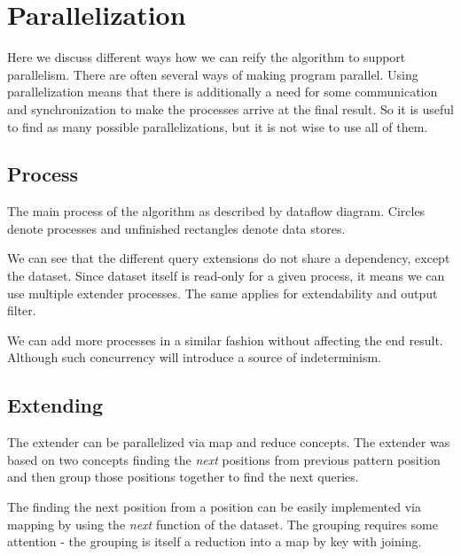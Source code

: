 \chapter{Parallelization}
\label{c:parallelization}

Here we discuss different ways how we can reify the algorithm to support parallelism. There are often several ways of making program parallel. Using parallelization means that there is additionally a need for some communication and synchronization to make the processes arrive at the final result. So it is useful to find as many possible parallelizations, but it is not wise to use all of them.

\section{Process}

The main process of the algorithm as described by dataflow diagram.\cite{Kahn74,Lee95} Circles denote processes and unfinished rectangles denote data stores.

\begin{figure}[H]
	\scalebox{0.8}{}
\end{figure}

We can see that the different query extensions do not share a dependency, except the dataset. Since dataset itself is read-only for a given process, it means we can use multiple extender processes. The same applies for extendability and output filter.

\begin{figure}[H]
  \scalebox{0.8}{}
\end{figure}

We can add more processes in a similar fashion without affecting the end result. Although such concurrency will introduce a source of indeterminism.

\section{Extending}

The extender can be parallelized via map and reduce concepts\cite{MapReduce,SteeleFold}. The extender was based on two concepts finding the \emph{next} positions from previous pattern position and then group those positions together to find the next queries.

The finding the next position from a position can be easily implemented via mapping by using the \emph{next} function of the dataset. The grouping requires some attention - the grouping is itself a reduction into a map by key with joining.

